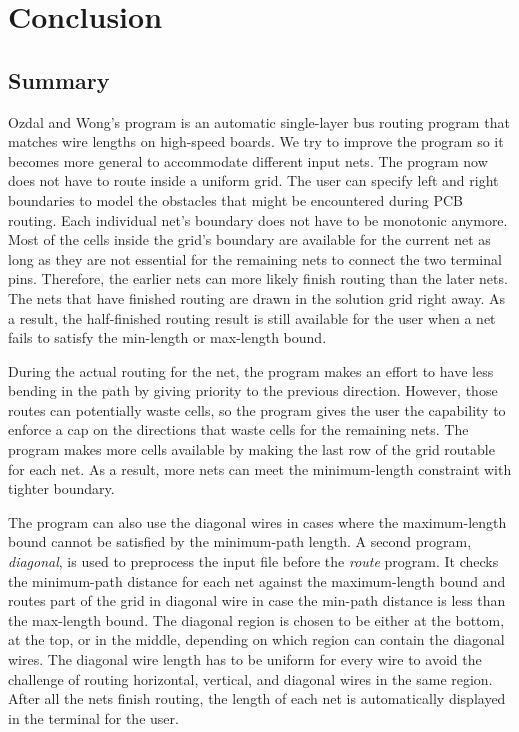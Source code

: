 \chapter{Conclusion}\label{chap-concl}

\section{Summary}\label{sec-sum}
Ozdal and Wong's program is an automatic single-layer bus routing program that matches wire lengths on high-speed boards. We try to improve the program so it becomes more general to accommodate different input nets. The program now does not have to route inside a uniform grid. The user can specify left and right boundaries to model the obstacles that might be encountered during PCB routing. Each individual net's boundary does not have to be monotonic anymore. Most of the cells inside the grid's boundary are available for the current net as long as they are not essential for the remaining nets to connect the two terminal pins. Therefore, the earlier nets can more likely finish routing than the later nets. The nets that have finished routing are drawn in the solution grid right away. As a result, the half-finished routing result is still available for the user when a net fails to satisfy the min-length or max-length bound.

During the actual routing for the net, the program makes an effort to have less bending in the path by giving priority to the previous direction. However, those routes can potentially waste cells, so the program gives the user the capability to enforce a cap on the directions that waste cells for the remaining nets. The program makes more cells available by making the last row of the grid routable for each net. As a result, more nets can meet the minimum-length constraint with tighter boundary.

The program can also use the diagonal wires in cases where the maximum-length bound cannot be satisfied by the minimum-path length. A second program, \textit{diagonal}, is used to preprocess the input file before the \textit{route} program. It checks the minimum-path distance for each net against the maximum-length bound and routes part of the grid in diagonal wire in case the min-path distance is less than the max-length bound. The diagonal region is chosen to be either at the bottom, at the top, or in the middle, depending on which region can contain the diagonal wires. The diagonal wire length has to be uniform for every wire to avoid the challenge of routing horizontal, vertical, and diagonal wires in the same region. After all the nets finish routing, the length of each net is automatically displayed in the terminal for the user.

